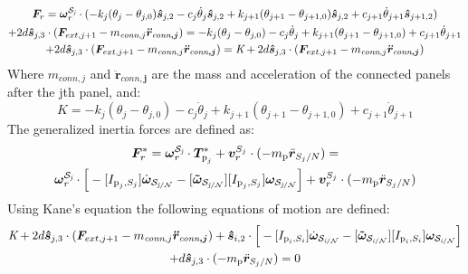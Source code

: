 \begin{multline}
	\bm F_{r} = \bm \omega_{\textit{r}}^{\cal{S}_\textit{j}} \cdot (-k_j (\theta_j-\theta_{j,0}) \bm{\hat{s}}_{j,2} - c_j \dot{\theta}_j \bm{\hat{s}}_{j,2}  +k_{j+1} (\theta_{j+1}-\theta_{j+1,0}) \bm{\hat{s}}_{j,2} +c_{j+1} \dot{\theta}_{j+1} \bm{\hat{s}}_{j+1,2})\\
	+ 2d\bm{\hat{s}}_{j,3}\cdot(\bm F_{ext,j+1} - m_{\textit{conn},j}\bm{\ddot{r}_{\textit{conn},j}}) = 
	-k_j (\theta_j-\theta_{j,0}) - c_j \dot{\theta}_j + k_{j+1} (\theta_{j+1}-\theta_{j+1,0}) + c_{j+1} \dot{\theta}_{j+1}\\
	+ 2d\bm{\hat{s}}_{j,3}\cdot(\bm F_{ext,j+1} - m_{\textit{conn},j}\bm{\ddot{r}_{\textit{conn},j}}) = \textit{K} + 2d\bm{\hat{s}}_{j,3}\cdot(\bm F_{ext,j+1} - m_{\textit{conn},j}\bm{\ddot{r}_{\textit{conn},j}}) 
\end{multline}
Where $m_{\textit{conn},j}$ and $\bm{\ddot{r}_{\textit{conn},j}}$ are the mass and acceleration of the connected panels after the jth panel, and:
\begin{equation}
	K= -k_j (\theta_j-\theta_{j,0}) - c_j \dot{\theta}_j + k_{j+1} (\theta_{j+1}-\theta_{j+1,0}) + c_{j+1} \dot{\theta}_{j+1}
\end{equation}
The generalized inertia forces are defined as:
\begin{multline}
	\bm F^*_{r} = \bm \omega_{\textit{r}}^{\cal{S}_\textit{j}} \cdot \bm T^*_{\text{p}_j}  +\bm v^{S_j}_{r} \cdot (-m_{\text{p}} \ddot{\bm r}_{S_{j}/N}) = \\ %
	\bm \omega_{\textit{r}}^{\cal{S}_\textit{j}} \cdot \Big[-[I_{\text{p}_j,S_j}] \dot{\bm\omega}_{\cal S_{\textit{j}/N}}  -[\bm{\tilde{\omega}}_{\cal S_{\textit{j}/N}}] [I_{\text{p}_j,S_j}] \bm\omega_{\cal S_{\textit{j}/N}} \Big] + \bm v^{S_j}_{r} \cdot (-m_{\text{p}} \ddot{\bm r}_{S_{j}/N}) %
\end{multline}
Using Kane's equation the following equations of motion are defined:
\begin{multline}
	\textit{K} + 2d\bm{\hat{s}}_{j,3}\cdot(\bm F_{ext,j+1} - m_{\textit{conn},j}\bm{\ddot{r}_{\textit{conn},j}}) + \bm{\hat{s}}_{i,2} \cdot \Big[-[I_{\text{p}_i,S_i}] \dot{\bm\omega}_{\cal S_{\textit{i}/N}}  -[\bm{\tilde{\omega}}_{\cal S_{\textit{i}/N}}] [I_{\text{p}_i,S_i}] \bm\omega_{\cal S_{\textit{i}/N}} \Big]\\
	+ d\bm{\hat{s}}_{j,3} \cdot (-m_{\text{p}} \ddot{\bm r}_{S_{j}/N}) = 0 %
	\label{eq:afterkane}
\end{multline}
